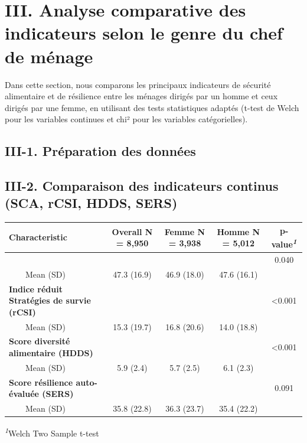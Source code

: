 \documentclass[
]{article}
\begin{document}
\hypertarget{iii.-analyse-comparative-des-indicateurs-selon-le-genre-du-chef-de-muxe9nage}{%
\section{III. Analyse comparative des indicateurs selon le genre du chef
de
ménage}\label{iii.-analyse-comparative-des-indicateurs-selon-le-genre-du-chef-de-muxe9nage}}

Dans cette section, nous comparons les principaux indicateurs de
sécurité alimentaire et de résilience entre les ménages dirigés par un
homme et ceux dirigés par une femme, en utilisant des tests statistiques
adaptés (t-test de Welch pour les variables continues et chi² pour les
variables catégorielles).

\hypertarget{iii-1.-pruxe9paration-des-donnuxe9es}{%
\subsection{III-1. Préparation des
données}\label{iii-1.-pruxe9paration-des-donnuxe9es}}

\hypertarget{iii-2.-comparaison-des-indicateurs-continus-sca-rcsi-hdds-sers}{%
\subsection{III-2. Comparaison des indicateurs continus (SCA, rCSI,
HDDS,
SERS)}\label{iii-2.-comparaison-des-indicateurs-continus-sca-rcsi-hdds-sers}}

\begin{table}[!t]
\fontsize{9.8pt}{11.7pt}\selectfont
\begin{tabular*}{\linewidth}{@{\extracolsep{\fill}}lcccc}
\toprule
\textbf{Characteristic} & \textbf{Overall}  N = 8,950 & \textbf{Femme}  N = 3,938 & \textbf{Homme}  N = 5,012 & \textbf{p-value}\textsuperscript{\textit{1}} \\ 
\midrule\addlinespace[2.5pt]
{\bfseries Score de conso. alimentaire (SCA)} &  &  &  & 0.040 \\ 
    Mean (SD) & 47.3 (16.9) & 46.9 (18.0) & 47.6 (16.1) &  \\ 
{\bfseries Indice réduit Stratégies de survie (rCSI)} &  &  &  & <0.001 \\ 
    Mean (SD) & 15.3 (19.7) & 16.8 (20.6) & 14.0 (18.8) &  \\ 
{\bfseries Score diversité alimentaire (HDDS)} &  &  &  & <0.001 \\ 
    Mean (SD) & 5.9 (2.4) & 5.7 (2.5) & 6.1 (2.3) &  \\ 
{\bfseries Score résilience auto-évaluée (SERS)} &  &  &  & 0.091 \\ 
    Mean (SD) & 35.8 (22.8) & 36.3 (23.7) & 35.4 (22.2) &  \\ 
\bottomrule
\end{tabular*}
\begin{minipage}{\linewidth}
\textsuperscript{\textit{1}}Welch Two Sample t-test\\
\end{minipage}
\end{table}
\end{document}
